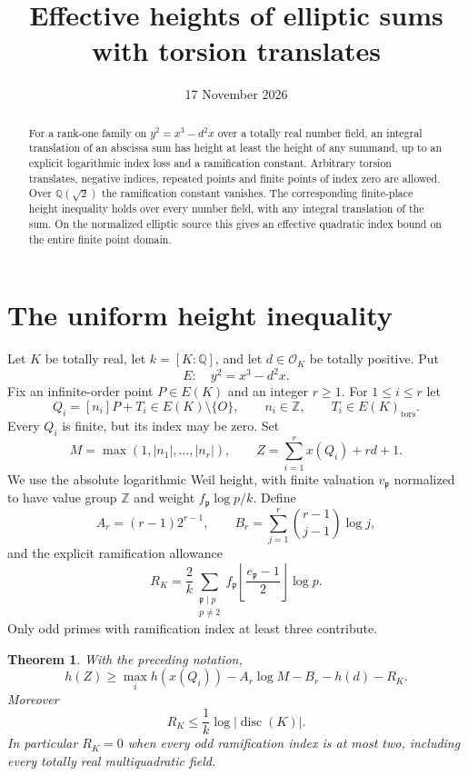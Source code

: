 \documentclass[11pt,a4paper]{article}
\title{Effective heights of elliptic sums with torsion translates}
\author{}\date{17 November 2026}
\newtheorem{theorem}{Theorem}[section]
\newcommand{\Q}{\mathbb Q}\newcommand{\Z}{\mathbb Z}
\begin{document}
\maketitle

\begin{abstract}
For a rank-one family on $y^2=x^3-d^2x$ over a totally real
number field, an integral translation of an abscissa sum has height
at least the height of any summand, up to an explicit logarithmic
index loss and a ramification constant. Arbitrary torsion translates,
negative indices, repeated points and finite points of index zero
are allowed. Over $\Q(\sqrt2)$ the ramification constant vanishes.
The corresponding finite-place height inequality holds over every
number field, with any integral translation of the sum.
On the normalized elliptic source this gives an effective quadratic
index bound on the entire finite point domain.
\end{abstract}

\section{The uniform height inequality}

Let $K$ be totally real, let $k=[K:\Q]$, and let
$d\in\mathcal O_K$ be totally positive. Put
\[
 E:\quad y^2=x^3-d^2x.
\]
Fix an infinite-order point $P\in E(K)$ and an integer $r\ge1$.
For $1\le i\le r$ let
\[
 Q_i=[n_i]P+T_i\in E(K)\setminus\{O\},\qquad
 n_i\in\Z,\qquad T_i\in E(K)_{\mathrm{tors}}.
\]
Every $Q_i$ is finite, but its index may be zero. Set
\[
 M=\max(1,|n_1|,\ldots,|n_r|),\qquad
 Z=\sum_{i=1}^r x(Q_i)+rd+1.
\]
We use the absolute logarithmic Weil height, with finite valuation
$v_\mathfrak p$ normalized to have value group $\Z$ and weight
$f_\mathfrak p\log p/k$.
Define
\[
 A_r=(r-1)2^{r-1},\qquad
 B_r=\sum_{j=1}^r\binom{r-1}{j-1}\log j,
\]
and the explicit ramification allowance
\[
 R_K=\frac2k\sum_{\substack{\mathfrak p\mid p\\p\ne2}}
       f_\mathfrak p\left\lfloor\frac{e_\mathfrak p-1}{2}\right\rfloor\log p.
\]
Only odd primes with ramification index at least three contribute.

\begin{theorem}\label{thm:main}
With the preceding notation,
\[
 h(Z)\ge\max_i h(x(Q_i))-A_r\log M-B_r-h(d)-R_K.
\]
Moreover
\[
 R_K\le\frac1k\log|\operatorname{disc}(K)|.
\]
In particular $R_K=0$ when every odd ramification index is at most
two, including every totally real multiquadratic field.
\end{theorem}
\end{document}
